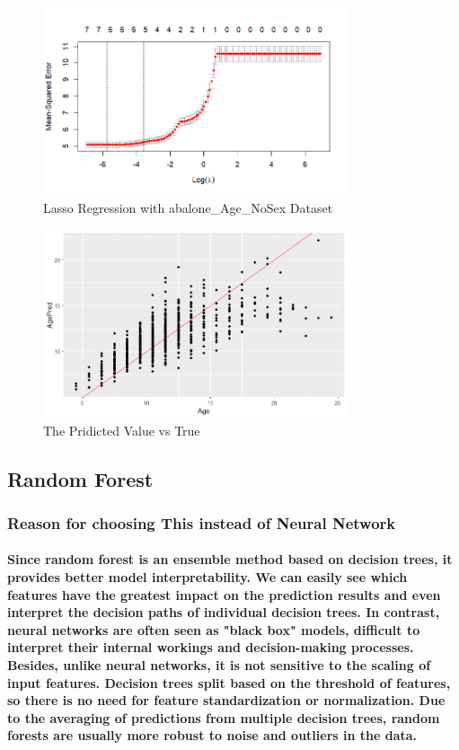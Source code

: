 \documentclass[11pt]{article} %
\begin{document}
% 
% 
\begin{figure}[H]
    \centering
    \includegraphics[width=0.8\textwidth]{Pic/lasso.png}
    \caption{Lasso Regression with abalone\_Age\_NoSex Dataset}
\end{figure}
% 
\begin{figure}[H]
    \centering
    \includegraphics[width=0.8\textwidth]{Pic/lasso_performance.png}
    \caption{The Pridicted Value vs True}
\end{figure}
% 
% 
% 
\subsection{Random Forest}
\subsubsection{Reason for choosing This instead of Neural Network}
\paragraph{Since random forest is an ensemble method based on decision trees, it provides better model interpretability. We can easily see which features have the greatest impact on the prediction results and even interpret the decision paths of individual decision trees. In contrast, neural networks are often seen as "black box" models, difficult to interpret their internal workings and decision-making processes. Besides, unlike neural networks, it is not sensitive to the scaling of input features. Decision trees split based on the threshold of features, so there is no need for feature standardization or normalization. Due to the averaging of predictions from multiple decision trees, random forests are usually more robust to noise and outliers in the data.}
\end{document}

